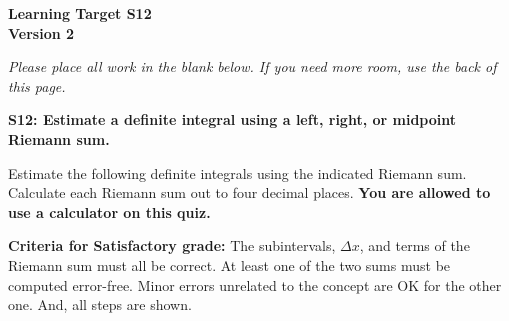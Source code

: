 \documentclass[10pt]{article}
\begin{document}
	\vspace*{0in}

		\begin{center}
			\textbf{Learning Target S12 \\
			Version 2} \\
		\end{center}

\emph{Please place all work in the blank below. If you need more room, use the back of this page.}

\begin{framed}
	\textbf{\textbf{S12:} Estimate a definite integral using a left, right, or midpoint Riemann sum.}
\end{framed}

Estimate the following definite integrals using the indicated Riemann sum. Calculate each Riemann sum out to four decimal places. \textbf{You are allowed to use a calculator on this quiz.}

\begin{enumerate}
    \item $\displaystyle{\int_1^3 2^x \, dx$ using a left Riemann sum with $n = 4$
    \item $\displaystyle{\int_1^3 2^x \, dx$ using a middle Riemann sum with $n = 2$
\end{enumerate}

\vfill


\begin{small}
    \begin{framed}
        	\textbf{Criteria for Satisfactory grade:} The subintervals, $\Delta x$, and terms of the Riemann sum must all be correct. At least one of the two sums must be computed error-free. Minor errors unrelated to the concept are OK for the other one. And, all steps are shown. 
    \end{framed}

\end{small}
\end{document}
